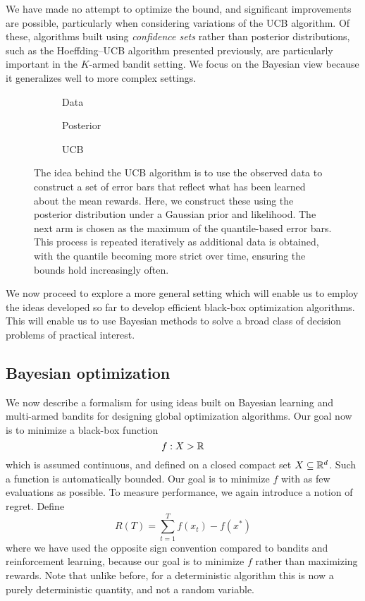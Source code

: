 \documentclass[11pt]{book}
\begin{document}
We have made no attempt to optimize the bound, and significant improvements are possible, particularly when considering variations of the UCB algorithm.
Of these, algorithms built using \emph{confidence sets} rather than posterior distributions, such as the Hoeffding--UCB algorithm presented previously, are particularly important in the $K$-armed bandit setting.
We focus on the Bayesian view because it generalizes well to more complex settings.

\begin{figure}
\begin{subfigure}{0.3\textwidth}

\caption{Data}
\end{subfigure}
\begin{subfigure}{0.3\textwidth}

\caption{Posterior}
\end{subfigure}
\begin{subfigure}{0.3\textwidth}

\caption{UCB}
\end{subfigure}
\caption{The idea behind the UCB algorithm is to use the observed data to construct a set of error bars that reflect what has been learned about the mean rewards.
Here, we construct these using the posterior distribution under a Gaussian prior and likelihood.
The next arm is chosen as the maximum of the quantile-based error bars.
This process is repeated iteratively as additional data is obtained, with the quantile becoming more strict over time, ensuring the bounds hold increasingly often.}
\end{figure}

We now proceed to explore a more general setting which will enable us to employ the ideas developed so far to develop efficient black-box optimization algorithms.
This will enable us to use Bayesian methods to solve a broad class of decision problems of practical interest.

\subsection{Bayesian optimization}
\label{sec:bayesian-optimization}

We now describe a formalism for using ideas built on Bayesian learning and multi-armed bandits for designing global optimization algorithms.
Our goal now is to minimize a black-box function
\[
f : X \-> \mathbb{R}    
\]
which is assumed continuous, and defined on a closed compact set $X \subseteq \mathbb{R}^d$.
Such a function is automatically bounded.
Our goal is to minimize $f$ with as few evaluations as possible.
To measure performance, we again introduce a notion of regret.
Define
\[
R(T) = \sum_{t=1}^T f(x_t) - f(x^*)    
\]
where we have used the opposite sign convention compared to bandits and reinforcement learning, because our goal is to minimize $f$ rather than maximizing rewards.
Note that unlike before, for a deterministic algorithm this is now a purely deterministic quantity, and not a random variable.
\end{document}
